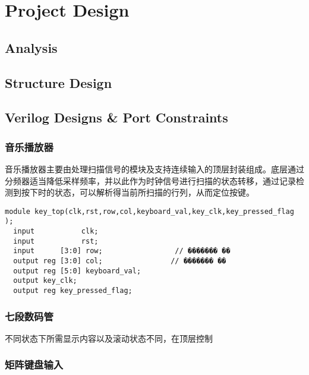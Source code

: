 \section{Project Design}

\subsection{Analysis}

\subsection{Structure Design}

\subsection{Verilog Designs \& Port Constraints}

\subsubsection{音乐播放器}
音乐播放器主要由处理扫描信号的模块及支持连续输入的顶层封装组成。底层通过分频器适当降低采样频率，并以此作为时钟信号进行扫描的状态转移，通过记录检测到按下时的状态，可以解析得当前所扫描的行列，从而定位按键。
\begin{lstlisting}[caption={key\_seg.v}]
module key_top(clk,rst,row,col,keyboard_val,key_clk,key_pressed_flag  );
  input           clk;
  input           rst;
  input      [3:0] row;                 // ������� ��
  output reg [3:0] col;                // ������� ��
  output reg [5:0] keyboard_val;
  output key_clk;
  output reg key_pressed_flag;

\end{lstlisting}



\subsubsection{七段数码管}
不同状态下所需显示内容以及滚动状态不同，在顶层控制


\subsubsection{矩阵键盘输入}
